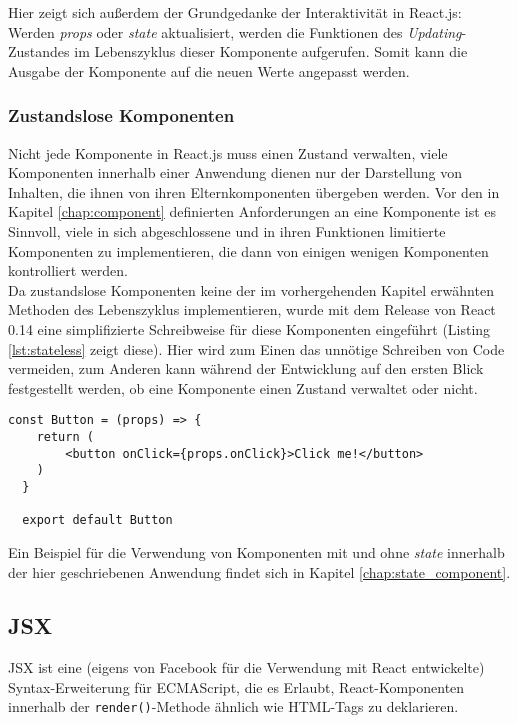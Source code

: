 Hier zeigt sich außerdem der Grundgedanke der Interaktivität in React.js: Werden \textit{props} oder \textit{state} aktualisiert, werden die Funktionen des \textit{Updating}-Zustandes im Lebenszyklus dieser Komponente aufgerufen. Somit kann die Ausgabe der Komponente auf die neuen Werte angepasst werden.

\subsubsection{Zustandslose Komponenten}
\label{chap:stateless}
Nicht jede Komponente in React.js muss einen Zustand verwalten, viele Komponenten innerhalb einer Anwendung dienen nur der Darstellung von Inhalten, die ihnen von ihren Elternkomponenten übergeben werden. Vor den in Kapitel \ref{chap:component} definierten Anforderungen an eine Komponente ist es Sinnvoll, viele in sich abgeschlossene und in ihren Funktionen limitierte Komponenten zu implementieren, die dann von einigen wenigen Komponenten kontrolliert werden.\\
Da zustandslose Komponenten keine der im vorhergehenden Kapitel erwähnten Methoden des Lebenszyklus implementieren, wurde mit dem Release von React 0.14\footnotemark{} eine simplifizierte Schreibweise für diese Komponenten eingeführt (Listing \ref{lst:stateless} zeigt diese). Hier wird zum Einen das unnötige Schreiben von Code vermeiden, zum Anderen kann während der Entwicklung auf den ersten Blick festgestellt werden, ob eine Komponente einen Zustand verwaltet oder nicht.


\begin{lstlisting}[caption={Simplifizierte Schreibweise für Komponenten ohne \textit{state}}, label=lst:stateless]
  const Button = (props) => {
  	return (
  		<button onClick={props.onClick}>Click me!</button>
  	)
  }

  export default Button
\end{lstlisting}

Ein Beispiel für die Verwendung von Komponenten mit und ohne \textit{state} innerhalb der hier geschriebenen Anwendung findet sich in Kapitel \ref{chap:state_component}.

\subsection{JSX}
\label{chap:jsx}
JSX ist eine (eigens von Facebook für die Verwendung mit React entwickelte) Syntax-Erweiterung für ECMAScript, die es Erlaubt, React-Komponenten innerhalb der \verb|render()|-Methode ähnlich wie HTML-Tags zu deklarieren.

